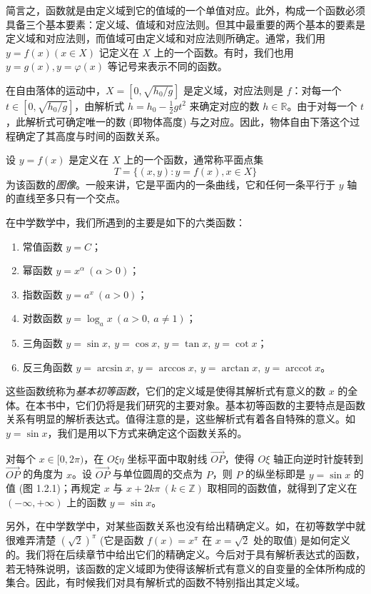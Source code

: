 \documentclass[UTF8,12pt,a4paper,fontset=fandol]{ctexbook}
\begin{document}
简言之，函数就是由定义域到它的值域的一个单值对应。此外，构成一个函数必须具备三个基本要素：定义域、值域和对应法则。但其中最重要的两个基本的要素是定义域和对应法则，而值域可由定义域和对应法则所确定。通常，我们用 $y=f(x)(x\in X)$ 记定义在 $X$ 上的一个函数。有时，我们也用 $y=g(x),y=\varphi(x)$ 等记号来表示不同的函数。

在自由落体的运动中，$X=[0,\sqrt{h_0/g}]$ 是定义域，对应法则是 $f$：对每一个 $t\in[0,\sqrt{h_0/g}]$，由解析式 $h=h_0-\frac12gt^2$ 来确定对应的数 $h\in\mathbb{R}$。由于对每一个 $t$，此解析式可确定唯一的数 (即物体高度) 与之对应。因此，物体自由下落这个过程确定了其高度与时间的函数关系。

设 $y=f(x)$ 是定义在 $X$ 上的一个函数，通常称平面点集
\[
  T=\{(x,y):y=f(x),x\in X\}
\]
为该函数的\emph{图像}。一般来讲，它是平面内的一条曲线，它和任何一条平行于 $y$ 轴的直线至多只有一个交点。

在中学数学中，我们所遇到的主要是如下的六类函数：
\begin{enumerate}
  \item 常值函数 $y=C$；
  \item 幂函数 $y=x^\alpha\ (\alpha>0)$；
  \item 指数函数 $y=a^x\ (a>0)$；
  \item 对数函数 $y=\log_a x\ (a>0,\ a\ne1)$；
  \item 三角函数 $y=\sin x,\ y=\cos x,\ y=\tan x,\ y=\cot x$；
  \item 反三角函数 $y=\arcsin x,\ y=\arccos x,\ y=\arctan x,\ y=\operatorname{arccot} x$。
\end{enumerate}
这些函数统称为\emph{基本初等函数}，它们的定义域是使得其解析式有意义的数 $x$ 的全体。在本书中，它们仍将是我们研究的主要对象。基本初等函数的主要特点是函数关系有明显的解析表达式。值得注意的是，这些解析式有着各自特殊的意义。如 $y=\sin x$，我们是用以下方式来确定这个函数关系的。

对每个 $x\in[0,2\pi)$，在 $O\xi\eta$ 坐标平面中取射线 $\overrightarrow{OP}$，使得 $O\xi$ 轴正向逆时针旋转到 $\overrightarrow{OP}$ 的角度为 $x$。设 $\overrightarrow{OP}$ 与单位圆周的交点为 $P$，则 $P$ 的纵坐标即是 $y=\sin x$ 的值 (图 1.2.1)；再规定 $x$ 与 $x+2k\pi\ (k\in\mathbb{Z})$ 取相同的函数值，就得到了定义在 $(-\infty,+\infty)$ 上的函数 $y=\sin x$。

另外，在中学数学中，对某些函数关系也没有给出精确定义。如，在初等数学中就很难弄清楚 $(\sqrt2)^\pi$ (它是函数 $f(x)=x^\pi$ 在 $x=\sqrt2$ 处的取值) 是如何定义的。我们将在后续章节中给出它们的精确定义。今后对于具有解析表达式的函数，若无特殊说明，该函数的定义域即为使得该解析式有意义的自变量的全体所构成的集合。因此，有时候我们对具有解析式的函数不特别指出其定义域。
\end{document}
